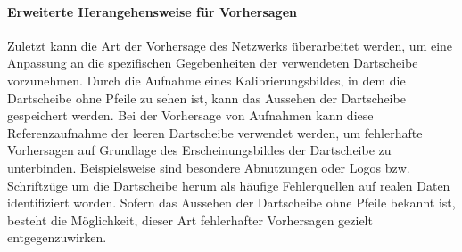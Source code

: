 
\paragraph{Erweiterte Herangehensweise für Vorhersagen}

Zuletzt kann die Art der Vorhersage des Netzwerks überarbeitet werden, um eine Anpassung an die spezifischen Gegebenheiten der verwendeten Dartscheibe vorzunehmen. Durch die Aufnahme eines Kalibrierungsbildes, in dem die Dartscheibe ohne Pfeile zu sehen ist, kann das Aussehen der Dartscheibe gespeichert werden. Bei der Vorhersage von Aufnahmen kann diese Referenzaufnahme der leeren Dartscheibe verwendet werden, um fehlerhafte Vorhersagen auf Grundlage des Erscheinungsbildes der Dartscheibe zu unterbinden. Beispielsweise sind besondere Abnutzungen oder Logos bzw. Schriftzüge um die Dartscheibe herum als häufige Fehlerquellen auf realen Daten identifiziert worden. Sofern das Aussehen der Dartscheibe ohne Pfeile bekannt ist, besteht die Möglichkeit, dieser Art fehlerhafter Vorhersagen gezielt entgegenzuwirken.

